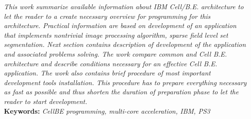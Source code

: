 \par
\textit{
This work summarize available information about IBM Cell/B.E. architecture to let the reader to a create necessary overview for programming for this architecture.
Practical information are based on development of an application that implements nontrivial image processing algorithm, sparse field level set segmentation.
Next section contains description of development of the application and associated problems solving.
The work compare common and Cell B.E. architecture and describe conditions necessary for an effective Cell B.E. application.
The work also contains brief procedure of most important development tools installation.
This procedure has to prepare everything necessary as fast as possible and thus shorten the duration of preparation phase to let the reader to start development.
}\\

\noindent
\textbf{Keywords:} \textit{CellBE programming, multi-core acceleration, IBM, PS3}

\pagebreak